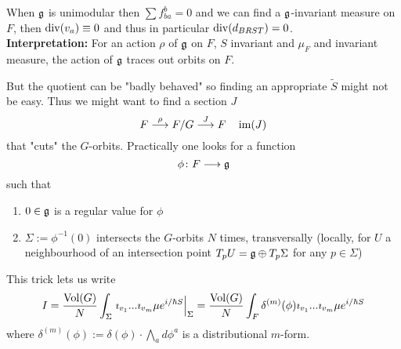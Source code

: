 When $\mathfrak{g}$ is unimodular then $\sum f^b_{ba} = 0$ and we can find a $\mathfrak{g}$-invariant measure on $F$, then $\operatorname{div}(v_a) \equiv 0$ and thus in particular $\operatorname{div}(d_{BRST}) = 0$.\\

\textbf{Interpretation:} For an action $\rho$ of $\mathfrak{g}$ on $F$, $S$ invariant and $\mu_F$ and invariant measure, the action of $\mathfrak{g}$ traces out orbits on $F$.

But the quotient can be "badly behaved" so finding an appropriate $\tilde{S}$ might not be easy. Thus we might want to find a section $J$
$$ F \overset{\rho}{\longrightarrow} F/G \overset{J}{\longrightarrow} F \quad \operatorname{im}(J) $$
that "cuts" the $G$-orbits. Practically one looks for a function
$$ \phi \colon F \lra \gf $$
such that
\begin{enumerate}
  \item $0 \in \mathfrak{g}$ is a regular value for $\phi$
  \item $\Sigma := \phi^{-1}(0)$ intersects the $G$-orbits $N$ times, transversally (locally, for $U$ a neighbourhood of an intersection point $T_p U = \mathfrak{g} \oplus T_p \Sigma$ for any $p \in \Sigma$)
\end{enumerate}

\begin{sketch}
  This trick lets us write
  \begin{align*}
    I = \frac{\vol(G)}{N} \int_\Sigma \left. \imath_{v_1} ... \imath_{v_m} \mu e^{i/\hbar S} \right|_\Sigma = \frac{\vol(G)}{N} \int_F \delta^{(m)}(\phi) \imath_{v_1} ... \imath_{v_m} \mu e^{i/\hbar S}
  \end{align*}
  where $\delta^{(m)}(\phi) := \delta(\phi) \cdot \bigwedge_a d\phi^a$ is a distributional $m$-form.
\end{sketch}

